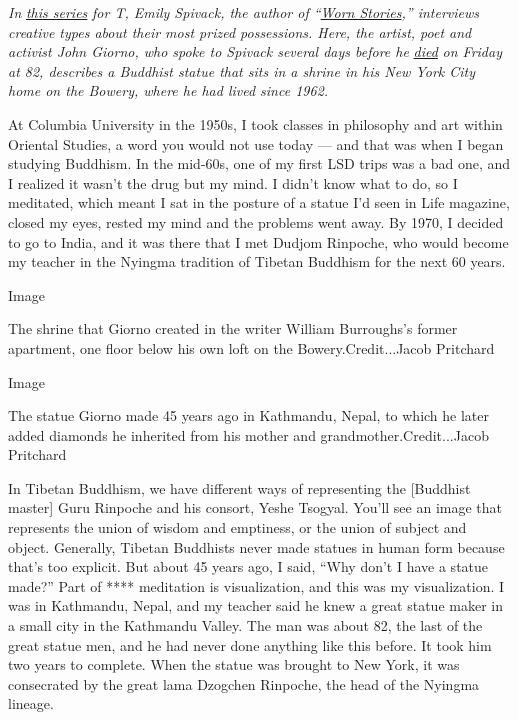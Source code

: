 \emph{In}
\href{https://www.nytimes3xbfgragh.onion/column/story-of-a-thing}{\emph{this
series}} \emph{for T, Emily Spivack, the author of
``}\href{http://wornstories.com/}{\emph{Worn Stories}}\emph{,''
interviews creative types about their most prized possessions. Here, the
artist, poet and activist John Giorno, who spoke to Spivack several days
before he}
\href{https://www.nytimes3xbfgragh.onion/2019/10/13/obituaries/john-giorno-dead.html?action=click\&module=Well\&pgtype=Homepage\&section=Obituaries}{\emph{died}}
\emph{on Friday at 82, describes a Buddhist statue that sits in a shrine
in his New York City home on the Bowery, where he had lived since 1962.}

At Columbia University in the 1950s, I took classes in philosophy and
art within Oriental Studies, a word you would not use today --- and that
was when I began studying Buddhism. In the mid-60s, one of my first LSD
trips was a bad one, and I realized it wasn't the drug but my mind. I
didn't know what to do, so I meditated, which meant I sat in the posture
of a statue I'd seen in Life magazine, closed my eyes, rested my mind
and the problems went away. By 1970, I decided to go to India, and it
was there that I met Dudjom Rinpoche, who would become my teacher in the
Nyingma tradition of Tibetan Buddhism for the next 60 years.

Image

The shrine that Giorno created in the writer William Burroughs's former
apartment, one floor below his own loft on the Bowery.Credit...Jacob
Pritchard

Image

The statue Giorno made 45 years ago in Kathmandu, Nepal, to which he
later added diamonds he inherited from his mother and
grandmother.Credit...Jacob Pritchard

In Tibetan Buddhism, we have different ways of representing the
{[}Buddhist master{]} Guru Rinpoche and his consort, Yeshe Tsogyal.
You'll see an image that represents the union of wisdom and emptiness,
or the union of subject and object. Generally, Tibetan Buddhists never
made statues in human form because that's too explicit. But about 45
years ago, I said, ``Why don't I have a statue made?'' Part of ****
meditation is visualization, and this was my visualization. I was in
Kathmandu, Nepal, and my teacher said he knew a great statue maker in a
small city in the Kathmandu Valley. The man was about 82, the last of
the great statue men, and he had never done anything like this before.
It took him two years to complete. When the statue was brought to New
York, it was consecrated by the great lama Dzogchen Rinpoche, the head
of the Nyingma lineage.

